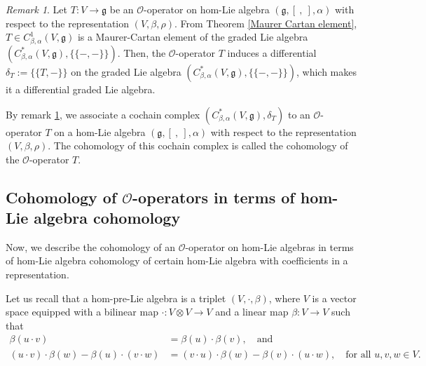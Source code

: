 \documentclass[a4paper,11pt]{amsart}
\theoremstyle{plain}
\theoremstyle{definition}
\theoremstyle{remark}
\newtheorem{remark}[theorem]{Remark}
\numberwithin{equation}{section}
\begin{document}
\begin{remark}\label{dgla}
Let $T:V\rightarrow \mathfrak{g}$ be an $\mathcal{O}$-operator on hom-Lie algebra $(\mathfrak{g},[~,~],\alpha)$ with respect to the representation $(V,\beta,\rho)$. From Theorem \ref{Maurer Cartan element}, $T\in C^1_{\beta,\alpha}(V,\mathfrak{g})$ is a Maurer-Cartan element of the graded Lie algebra $(C^*_{\beta,\alpha}(V,\mathfrak{g}),\{\!\!\{-,-\}\!\!\})$. Then, the $\mathcal{O}$-operator $T$ induces a differential $\delta_T:=\{\!\!\{T,-\}\!\!\}$ on the graded Lie algebra $(C^*_{\beta,\alpha}(V,\mathfrak{g}),\{\!\!\{-,-\}\!\!\})$, which makes it a differential graded Lie algebra.  
\end{remark}

By remark \ref{dgla}, we associate a cochain complex $(C^*_{\beta,\alpha}(V,\mathfrak{g}),\delta_T)$ to an $\mathcal{O}$-operator $T$ on a hom-Lie algebra $(\mathfrak{g},[~,~],\alpha)$ with respect to the representation $(V,\beta,\rho)$. The cohomology of this cochain complex is called the cohomology of the $\mathcal{O}$-operator $T$. 
 

\subsection{Cohomology of $\mathcal{O}$-operators in terms of hom-Lie algebra cohomology}
Now, we describe the cohomology of an $\mathcal{O}$-operator on hom-Lie algebras in terms of hom-Lie algebra cohomology of certain hom-Lie algebra with coefficients in a representation. 


Let us recall that a hom-pre-Lie algebra is a triplet $(V,\cdot,\beta)$, where $V$ is a vector space equipped with a bilinear map $\cdot: V\otimes V\rightarrow V$ and a linear map $\beta: V\rightarrow V$ such that 
\begin{align*}
\beta(u\cdot v)&=\beta(u)\cdot \beta(v), \quad \mbox{and}\\
(u\cdot v)\cdot  \beta(w) - \beta(u)\cdot  (v\cdot  w) &= (v\cdot u)\cdot \beta(w) - \beta(v)\cdot (u\cdot w),\quad\mbox{for all } u,v,w\in V.
\end{align*}
\end{document}
